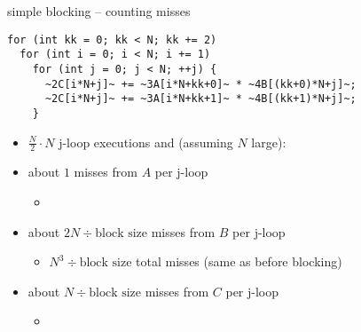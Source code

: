 \begin{frame}[fragile,label=cacheBlockKLoads]{simple blocking -- counting misses}
\begin{lstlisting}
for (int kk = 0; kk < N; kk += 2)
  for (int i = 0; i < N; i += 1)
    for (int j = 0; j < N; ++j) {
      ~2C[i*N+j]~ += ~3A[i*N+kk+0]~ * ~4B[(kk+0)*N+j]~;
      ~2C[i*N+j]~ += ~3A[i*N+kk+1]~ * ~4B[(kk+1)*N+j]~;
    }
\end{lstlisting}
\begin{itemize}
\item $\frac{N}{2}\cdot N$ j-loop executions and (assuming $N$ large):
\item about $1$ misses from $A$ per j-loop 
    \begin{itemize}
    \item {}
    \end{itemize}
\item about $2N\div\text{block size}$ misses from $B$ per j-loop 
    \begin{itemize}
    \item $N^3\div\text{block size}$ total misses (same as before blocking)
    \end{itemize}
\item about $N\div\text{block size}$ misses from $C$ per j-loop 
    \begin{itemize}
    \item {}
    \end{itemize}
\end{itemize}
\end{frame}

